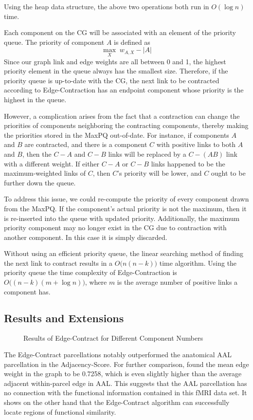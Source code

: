Using the heap data structure, the above two operations both run in
$O(\log n)$ time.

Each component on the CG will be associated with an element of the
priority queue. The priority of component $A$ is defined as
\[ \max_{X}\;w_{A,X} - |A| \]
Since our graph link and edge weights are all between 0 and 1, the
highest priority element in the queue always has the smallest size.
Therefore, if the priority queue is up-to-date with the CG, the
next link to be contracted according to Edge-Contraction has
an endpoint component whose priority is the highest in the queue.

However, a complication arises from the fact that a contraction can
change the priorities of components neighboring the contracting
components, thereby making the priorities stored in the MaxPQ
out-of-date. For instance, if components $A$ and $B$ are contracted, and
there is a component $C$ with positive links to both $A$ and $B$, then
the $C-A$ and $C-B$ links will be replaced by a $C-(AB)$ link with a
different weight. If either $C-A$ or $C-B$ links happened to be the
maximum-weighted links of $C$, then $C$'s priority will be lower,
and $C$ ought to be further down the queue.

To address this issue, we could re-compute the priority of every
component drawn from the MaxPQ. If the component's actual priority is
not the maximum, then it is re-inserted into the queue with updated
priority. Additionally, the maximum priority component may no longer
exist in the CG due to contraction with another component. In this case
it is simply discarded.

Without using an efficient priority queue, the linear searching method
of finding the next link to contract results in a $O\big(n (n-k)\big)$
time algorithm. Using the priority queue the time complexity of
Edge-Contraction is $O \big((n - k) (m + \log n)\big)$, where $m$ is
the average number of positive links a component has.

\subsection{Results and Extensions}

\begin{figure}
\caption{Results of Edge-Contract for Different Component Numbers}
\end{figure}

The Edge-Contract parcellations notably outperformed the anatomical AAL
parcellation in the Adjacency-Score. For further comparison, found the
mean edge weight in the graph to be 0.7258, which is even slightly
higher than the average adjacent within-parcel edge in AAL. This suggests
that the AAL parcellation has no connection with the functional
information contained in this fMRI data set. It shows on the other
hand that the Edge-Contract algorithm can successfully locate regions of
functional similarity.

